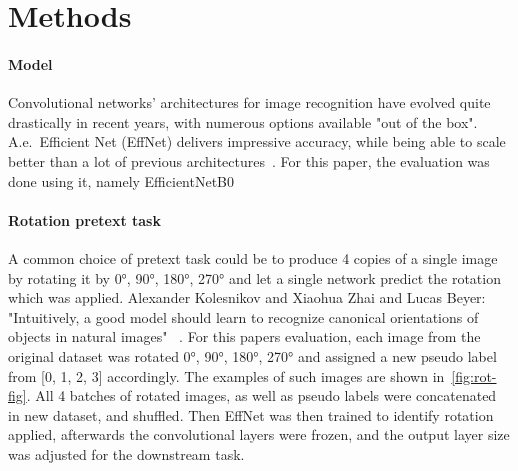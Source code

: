\section{Methods}

\paragraph{Model}
Convolutional networks' architectures for image recognition have evolved quite drastically in recent years,
with numerous options available "out of the box".
A.e.\ Efficient Net (EffNet) delivers impressive accuracy, while being able to scale better than a lot of
previous architectures~\cite{DBLP:journals/corr/abs-1905-11946}.
For this paper, the evaluation was done using it, namely EfficientNetB0~\cite{KerasEffNet}

\paragraph{Rotation pretext task}
A common choice of pretext task could be to produce 4 copies of
a single image by rotating it by {0°, 90°, 180°, 270°} and let a single network predict the rotation which was applied.
Alexander Kolesnikov and Xiaohua Zhai and Lucas Beyer: "Intuitively, a good model should learn to
recognize canonical orientations of objects in natural images" ~\cite{kolesnikov2019revisiting}.
For this papers evaluation, each image from the original dataset was rotated 0°, 90°, 180°,
270° and assigned a new pseudo label from [0, 1, 2, 3] accordingly.
The examples of such images are shown in~\ref{fig:rot-fig}.
All 4 batches of rotated images, as well as pseudo labels were concatenated in new dataset, and shuffled.
Then EffNet was then trained to identify rotation applied, afterwards the convolutional layers were frozen,
and the output layer size was adjusted for the downstream task.

